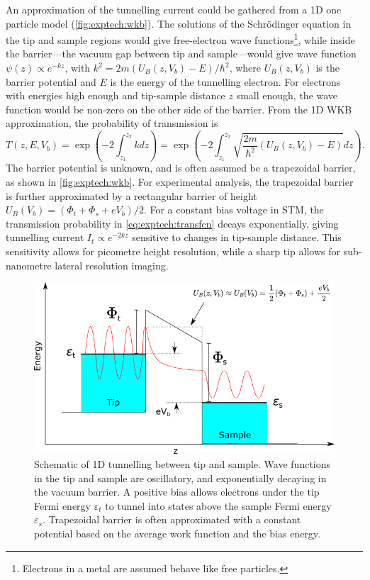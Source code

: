 \sloppy An approximation of the tunnelling current could be gathered from a \ac{1D} one particle model (\autoref{fig:exptech:wkb}). The solutions of the Schr\"odinger equation in the tip and sample regions would give free-electron wave functions\footnote{Electrons in a metal are assumed behave like free particles.}, while inside the barrier---the vacuum gap between tip and sample---would give wave function $\psi(z) \propto e^{-kz}$, with $k^2 = 2m({U_B(z,V_b) - E})/\hbar^2$, where $U_B(z,V_b)$ is the barrier potential and $E$ is the energy of the tunnelling electron. For electrons with energies high enough and tip-sample distance $z$ small enough, the wave function would be non-zero on the other side of the barrier. From the \ac{1D} \ac{WKB} approximation, the probability of transmission is
\begin{equation} \label{eq:exptech:transfcn}
T(z,E,V_b) = \exp{\left(-2\int_{z_1} ^{z_2} k dz \right)} = \exp{\left(-2  \int_{z_1}^{z_2} \sqrt{\frac{2m}{\hbar^2}\left(U_B(z,V_b) - E\right)} dz \right)}.
\end{equation}
 The barrier potential is unknown, and is often assumed be a trapezoidal barrier, as shown in \autoref{fig:exptech:wkb}. For experimental analysis, the trapezoidal barrier is further approximated by a rectangular barrier of height $U_B(V_b) = (\Phi_t + \Phi_s + eV_b)/2$. For a constant bias voltage in \ac{STM}, the transmission probability in \autoref{eq:exptech:transfcn} decays exponentially, giving tunnelling current $I_t \propto e^{-2kz}$ sensitive to changes in tip-sample distance. This sensitivity allows for picometre height resolution, while a sharp tip allows for sub-nanometre lateral resolution imaging.


\begin{figure} [t]
    \centering
    \includegraphics[width=\textwidth]{pictures/wkb.png}
    \caption{Schematic of 1D tunnelling between tip and sample. Wave functions in the tip and sample are oscillatory, and exponentially decaying in the vacuum barrier. A positive bias allows electrons under the tip Fermi energy $\varepsilon_t$ to tunnel into states above the sample Fermi energy $\varepsilon_s$.
    Trapezoidal barrier is often approximated with a constant potential based on the average work function and the bias energy.}
    \label{fig:exptech:wkb}
\end{figure}

